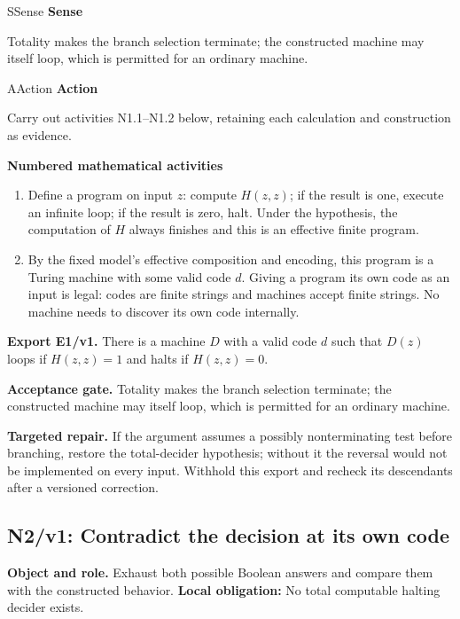\documentclass[preprint,12pt,aps,pra,showkeys,amsmath,amssymb,superscriptaddress,floatfix]{revtex4-2}
\theoremstyle{definition}
\theoremstyle{remark}
\newcommand{\mmfaculty}[3]{%
 \begin{mmfacultybox}{#1}{#2}
 {\sffamily\bfseries\color{MMBlue}#2}\par\smallskip #3
 \end{mmfacultybox}}
\newcommand{\field}[2]{\par\smallskip\noindent\textbf{#1.} #2\par}
\begin{document}
\mmfaculty{S}{Sense}{Totality makes the branch selection terminate; the constructed machine
may itself loop, which is permitted for an ordinary machine.}

\mmfaculty{A}{Action}{Carry out activities N1.1--N1.2 below, retaining each calculation and
construction as evidence.}

\smallskip\noindent\textbf{Numbered mathematical activities}

\begin{enumerate}[label=N1.\arabic*,leftmargin=3.4em]

\item Define a program on input \(z\): compute \(H(z,z)\); if the result is
one, execute an infinite loop; if the result is zero, halt. Under the
hypothesis, the computation of \(H\) always finishes and this is an
effective finite program.

\item By the fixed model's effective composition and encoding, this program is
a Turing machine with some valid code \(d\). Giving a program its own
code as an input is legal: codes are finite strings and machines accept
finite strings. No machine needs to discover its own code internally.

\end{enumerate}

\field{Export E1/v1}{There is a machine \(D\) with a valid code \(d\) such that \(D(z)\)
loops if \(H(z,z)=1\) and halts if \(H(z,z)=0\).}

\field{Acceptance gate}{Totality makes the branch selection terminate; the constructed machine
may itself loop, which is permitted for an ordinary machine.}

\field{Targeted repair}{If the argument assumes a possibly nonterminating test before branching,
restore the total-decider hypothesis; without it the reversal would not
be implemented on every input. Withhold this export and recheck its
descendants after a versioned correction.}

\clearpage

\subsection{N2/v1: Contradict the decision at its own code}

\field{Object and role}{Exhaust both possible Boolean answers and compare them with the
constructed behavior. \textbf{Local obligation:} No total computable
halting decider exists.}
\end{document}
